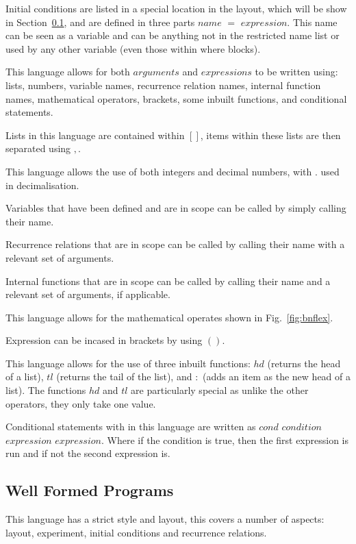 \documentclass{article}
\begin{document}
Initial conditions are listed in a special location in the layout, which will be show in Section~\ref{wellformedprogs}, and are defined in three parts $name$ $=$ $expression$. This name can be seen as a variable and can be anything not in the restricted name list or used by any other variable (even those within where blocks). 

This language allows for both $arguments$ and $expressions$ to be written using: lists, numbers, variable names, recurrence relation names, internal function names, mathematical operators, brackets, some inbuilt functions, and conditional statements. 

Lists in this language are contained within $[]$, items within these lists are then separated using $,$.  

This language allows the use of both integers and decimal numbers, with $.$ used in decimalisation. 

Variables that have been defined and are in scope can be called by simply calling their name. 

Recurrence relations that are in scope can be called by calling their name with a relevant set of arguments.  

Internal functions that are in scope can be called by calling their name and a relevant set of arguments, if applicable. 

This language allows for the mathematical operates shown in Fig.~\ref{fig:bnflex}.

Expression can be incased in brackets by using $()$.

This language allows for the use of three inbuilt functions: $hd$ (returns the head of a list), $tl$ (returns the tail of the list), and $:$ (adds an item as the new head of a list). The functions $hd$ and $tl$ are particularly special as unlike the other operators, they only take one value. 

Conditional statements with in this language are written as $cond$ $condition$ $expression$ $expression$. Where if the condition is true, then the first expression is run and if not the second expression is.  


\subsection{Well Formed Programs} \label{wellformedprogs} 
This language has a strict style and layout, this covers a number of aspects: layout, experiment, initial conditions and recurrence relations.  
\end{document}
